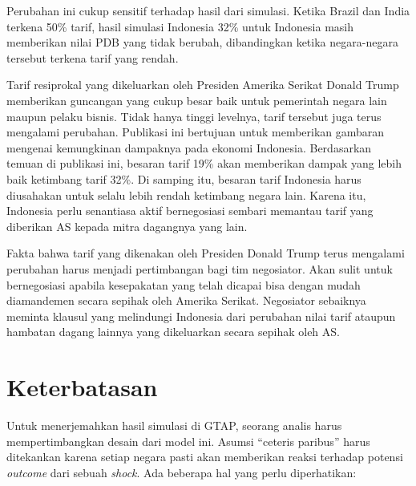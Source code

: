 \documentclass[
]{interact}
\begin{document}
Perubahan ini cukup sensitif terhadap hasil dari simulasi. Ketika Brazil
dan India terkena 50\% tarif, hasil simulasi Indonesia 32\% untuk
Indonesia masih memberikan nilai PDB yang tidak berubah, dibandingkan
ketika negara-negara tersebut terkena tarif yang rendah.

Tarif resiprokal yang dikeluarkan oleh Presiden Amerika Serikat Donald
Trump memberikan guncangan yang cukup besar baik untuk pemerintah negara
lain maupun pelaku bisnis. Tidak hanya tinggi levelnya, tarif tersebut
juga terus mengalami perubahan. Publikasi ini bertujuan untuk memberikan
gambaran mengenai kemungkinan dampaknya pada ekonomi Indonesia.
Berdasarkan temuan di publikasi ini, besaran tarif 19\% akan memberikan
dampak yang lebih baik ketimbang tarif 32\%. Di samping itu, besaran
tarif Indonesia harus diusahakan untuk selalu lebih rendah ketimbang
negara lain. Karena itu, Indonesia perlu senantiasa aktif bernegosiasi
sembari memantau tarif yang diberikan AS kepada mitra dagangnya yang
lain.

Fakta bahwa tarif yang dikenakan oleh Presiden Donald Trump terus
mengalami perubahan harus menjadi pertimbangan bagi tim negosiator. Akan
sulit untuk bernegosiasi apabila kesepakatan yang telah dicapai bisa
dengan mudah diamandemen secara sepihak oleh Amerika Serikat. Negosiator
sebaiknya meminta klausul yang melindungi Indonesia dari perubahan nilai
tarif ataupun hambatan dagang lainnya yang dikeluarkan secara sepihak
oleh AS.

\section{Keterbatasan}\label{keterbatasan}

Untuk menerjemahkan hasil simulasi di GTAP, seorang analis harus
mempertimbangkan desain dari model ini. Asumsi ``ceteris paribus'' harus
ditekankan karena setiap negara pasti akan memberikan reaksi terhadap
potensi \emph{outcome} dari sebuah \emph{shock}. Ada beberapa hal yang
perlu diperhatikan:
\end{document}
